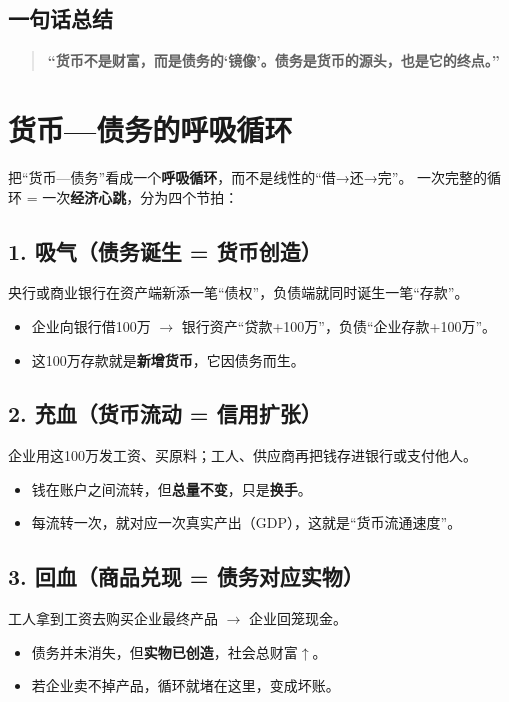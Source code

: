 \subsection*{一句话总结}
\begin{quote}
\textbf{“货币不是财富，而是债务的‘镜像’。债务是货币的源头，也是它的终点。”}
\end{quote}



\section{货币—债务的呼吸循环}

把“货币—债务”看成一个\textbf{呼吸循环}，而不是线性的“借→还→完”。  
一次完整的循环 = 一次\textbf{经济心跳}，分为四个节拍：

\subsection*{1. 吸气（债务诞生 = 货币创造）}
央行或商业银行在资产端新添一笔“债权”，负债端就同时诞生一笔“存款”。  
\begin{itemize}
  \item 企业向银行借100万 $\rightarrow$ 银行资产“贷款+100万”，负债“企业存款+100万”。
  \item 这100万存款就是\textbf{新增货币}，它因债务而生。
\end{itemize}

\subsection*{2. 充血（货币流动 = 信用扩张）}
企业用这100万发工资、买原料；工人、供应商再把钱存进银行或支付他人。  
\begin{itemize}
  \item 钱在账户之间流转，但\textbf{总量不变}，只是\textbf{换手}。
  \item 每流转一次，就对应一次真实产出（GDP），这就是“货币流通速度”。
\end{itemize}

\subsection*{3. 回血（商品兑现 = 债务对应实物）}
工人拿到工资去购买企业最终产品 $\rightarrow$ 企业回笼现金。  
\begin{itemize}
  \item 债务并未消失，但\textbf{实物已创造}，社会总财富$\uparrow$。
  \item 若企业卖不掉产品，循环就堵在这里，变成坏账。
\end{itemize}

